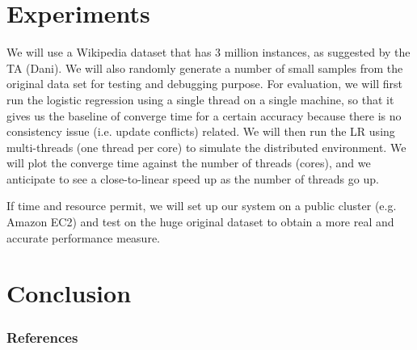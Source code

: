 \documentclass{article} %
\begin{document}
\section{Experiments}
\label{others}
We will use a Wikipedia dataset that has 3 million instances, as suggested by the TA (Dani). We will also randomly generate a number of small samples from the original data set for testing and debugging purpose. For evaluation, we will first run the logistic regression using a single thread on a single machine, so that it gives us the baseline of converge time for a certain accuracy because there is no consistency issue (i.e. update conflicts) related. We will then run the LR using multi-threads (one thread per core) to simulate the distributed environment. We will plot the converge time against the number of threads (cores), and we anticipate to see a close-to-linear speed up as the number of threads go up.

If time and resource permit, we will set up our system on a public cluster (e.g. Amazon EC2) and test on the huge original dataset to obtain a more real and accurate performance measure.

\section{Conclusion}


\subsubsection*{References}
\end{document}
